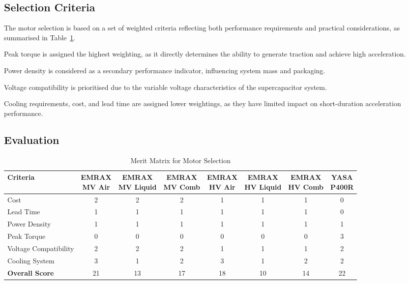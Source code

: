 \subsection{Selection Criteria}

The motor selection is based on a set of weighted criteria reflecting both performance requirements and practical considerations, as summarised in Table~\ref{tab:motor_selection}.

Peak torque is assigned the highest weighting, as it directly determines the ability to generate traction and achieve high acceleration.

Power density is considered as a secondary performance indicator, influencing system mass and packaging.

Voltage compatibility is prioritised due to the variable voltage characteristics of the supercapacitor system.

Cooling requirements, cost, and lead time are assigned lower weightings, as they have limited impact on short-duration acceleration performance.

\subsection{Evaluation}

\begin{table}[H]
\centering
\small
\renewcommand{\arraystretch}{1.5}
\setlength{\tabcolsep}{4pt}

\caption{Merit Matrix for Motor Selection}
\label{tab:motor_selection}

\begin{tabular}{lccccccc}
\toprule
\textbf{Criteria} 
& \shortstack{EMRAX \\ MV Air} 
& \shortstack{EMRAX \\ MV Liquid} 
& \shortstack{EMRAX \\ MV Comb} 
& \shortstack{EMRAX \\ HV Air} 
& \shortstack{EMRAX \\ HV Liquid} 
& \shortstack{EMRAX \\ HV Comb} 
& \shortstack{YASA \\ P400R} \\
\midrule
Cost & 2 & 2 & 2 & 1 & 1 & 1 & 0 \\
Lead Time & 1 & 1 & 1 & 1 & 1 & 1 & 0 \\
Power Density & 1 & 1 & 1 & 1 & 1 & 1 & 1 \\
Peak Torque & 0 & 0 & 0 & 0 & 0 & 0 & 3 \\
Voltage Compatibility & 2 & 2 & 2 & 1 & 1 & 1 & 2 \\
Cooling System & 3 & 1 & 2 & 3 & 1 & 2 & 2 \\
\midrule
\textbf{Overall Score} & 21 & 13 & 17 & 18 & 10 & 14 & 22 \\
\bottomrule
\end{tabular}
\end{table}

